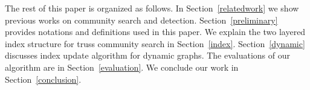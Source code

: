 The rest of this paper is organized as follows. In Section~\ref{relatedwork} we show previous works on community search and detection. Section~\ref{preliminary} provides notations and definitions used in this paper. We explain the two layered index structure for truss community search in Section~\ref{index}. Section~\ref{dynamic} discusses index update algorithm for dynamic graphs. The evaluations of our algorithm are in Section~\ref{evaluation}. We conclude our work in Section~\ref{conclusion}.


~\cite{durmaz2017frequent}



